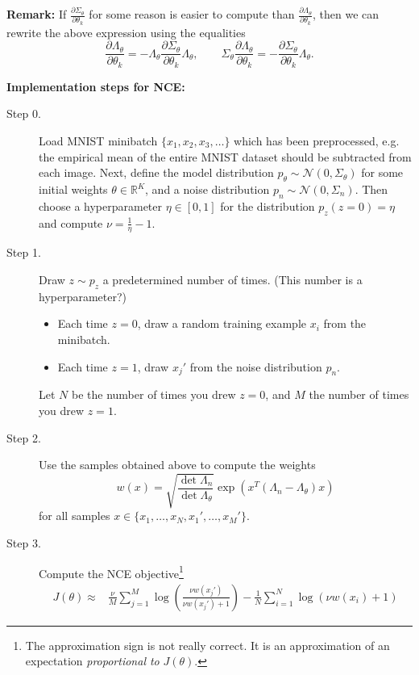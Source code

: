\documentclass[a4paper]{article}
\begin{document}
\textbf{Remark:} If $\frac{\partial \Sigma_\theta}{\partial \theta_k}$ for some reason is easier to compute than $\frac{\partial \Lambda_\theta}{\partial \theta_k}$, then we can rewrite the above expression using the equalities
$$\frac{\partial \Lambda_\theta}{\partial \theta_k} = - \Lambda_\theta \frac{\partial \Sigma_\theta}{\partial \theta_k} \Lambda_\theta, \qquad \Sigma_\theta \frac{\partial \Lambda_\theta}{\partial \theta_k} = - \frac{\partial \Sigma_\theta}{\partial \theta_k} \Lambda_\theta.$$

\newpage
\textbf{\large Implementation steps for NCE:}

\begin{description}
\item[Step 0.] Load MNIST minibatch $\{x_1,x_2,x_3,\ldots\}$ which has been preprocessed, e.g. the empirical mean of the entire MNIST dataset should be subtracted from each image. Next, define the model distribution $p_\theta \sim \mathcal{N}(0,\Sigma_\theta)$ for some initial weights $\theta \in \mathbb{R}^K$, and a noise distribution $p_n \sim \mathcal{N}(0,\Sigma_n)$. Then choose a hyperparameter $\eta \in [0,1]$ for the distribution $p_z(z=0) = \eta$ and compute $\nu = \frac{1}{\eta} - 1$.

\item[Step 1.] Draw $z \sim p_z$ a predetermined number of times. (This number is a hyperparameter?)
\begin{itemize}
\item Each time $z = 0$, draw a random training example $x_i$ from the minibatch.
\item Each time $z = 1$, draw $x_j'$ from the noise distribution $p_n$.
\end{itemize}
Let $N$ be the number of times you drew $z = 0$, and $M$ the number of times you drew $z = 1$.

\item[Step 2.] Use the samples obtained above to compute the weights
$$w(x) =  \sqrt{\frac{\det \Lambda_n}{\det \Lambda_\theta}} \exp\left({x}^T (\Lambda_n - \Lambda_\theta) {x}\right)$$
for all samples $x \in \{ x_1,\ldots,x_N,x_1',\ldots,x_M'\}$.

\item[Step 3.] Compute the NCE objective\footnote{The approximation sign is not really correct. It is an approximation of an expectation \emph{proportional to} $J(\theta)$.}
$$\boxed{\begin{aligned}
J(\theta) \approx &\frac{\nu}{M} \sum_{j=1}^M \log\left( \frac{\nu w(x_j')}{\nu w(x_j') + 1}\right) -\frac{1}{N} \sum_{i=1}^N \log\left( \nu w(x_i) + 1\right)
\end{aligned}}$$


\end{description}
\end{document}
